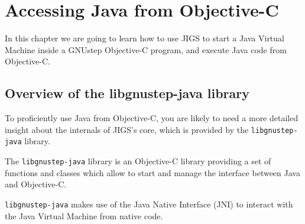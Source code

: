 \chapter{Accessing Java from Objective-C}

In this chapter we are going to learn how to use JIGS to start a Java
Virtual Machine inside a GNUstep Objective-C program, and execute Java
code from Objective-C.

\section{Overview of the libgnustep-java library}

To proficiently use Java from Objective-C, you are likely to need a
more detailed insight about the internals of JIGS's core, which is
provided by the \texttt{libgnustep-java} library.

The \texttt{libgnustep-java} library is an Objective-C library
providing a set of functions and classes which allow to start and
manage the interface between Java and Objective-C.

\texttt{libgnustep-java} makes use of the Java Native Interface (JNI) 
to interact with the Java Virtual Machine from native code.

